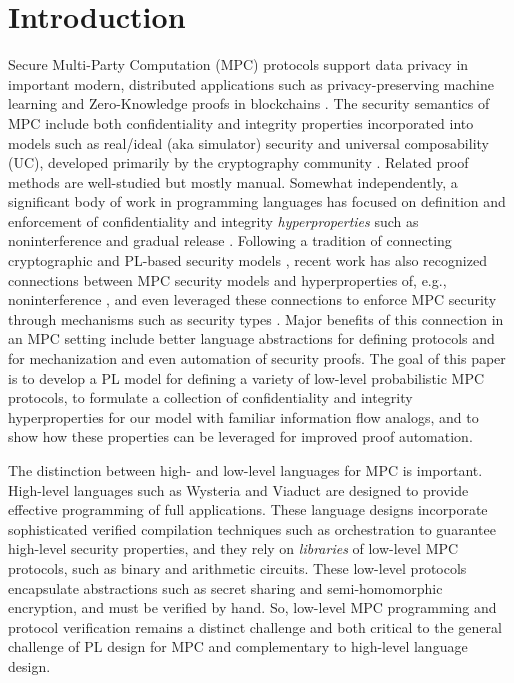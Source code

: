 \section{Introduction}

Secure Multi-Party Computation (MPC) protocols support data privacy in
important modern, distributed applications such as privacy-preserving
machine learning \cite{li2021privacy, knott2021crypten,
  koch2020privacy, liu2020privacy} and Zero-Knowledge proofs in
blockchains \cite{ishai2009zero, lu2019honeybadgermpc,
  gao2022symmeproof, tomaz2020preserving}. The security semantics of
MPC include both confidentiality and integrity properties incorporated
into models such as real/ideal (aka simulator) security and universal
composability (UC), developed primarily by the cryptography community
\cite{evans2018pragmatic}.  Related proof methods are well-studied
\cite{Lindell2017} but mostly manual. Somewhat independently, a
significant body of work in programming languages has focused on
definition and enforcement of confidentiality and integrity
\emph{hyperproperties} \cite{10.5555/1891823.1891830} such as
noninterference and gradual release
\cite{4223226,sabelfeld2009declassification}. Following a tradition of
connecting cryptographic and PL-based security models
\cite{10.1007/3-540-44929-9_1,10.1145/3571740}, recent work has also
recognized connections between MPC security models and hyperproperties
of, e.g., noninterference \cite{8429300}, and even leveraged these
connections to enforce MPC security through mechanisms such as
security types \cite{10.1145/3453483.3454074}. Major benefits of this
connection in an MPC setting include better language abstractions for
defining protocols and for mechanization and even automation of
security proofs.  The goal of this paper is to develop a PL model for
defining a variety of low-level probabilistic MPC protocols, to
formulate a collection of confidentiality and integrity
hyperproperties for our model with familiar information flow
analogs, and to show how these properties can be leveraged for
improved proof automation.

The distinction between high- and low-level languages for MPC is
important. High-level languages such as Wysteria
\cite{rastogi2014wysteria} and Viaduct \cite{10.1145/3453483.3454074}
are designed to provide effective programming of full
applications. These language designs incorporate sophisticated
verified compilation techniques such as orchestration
\cite{viaduct-UC} to guarantee high-level security properties, and
they rely on \emph{libraries} of low-level MPC protocols, such as
binary and arithmetic circuits. These low-level protocols encapsulate
abstractions such as secret sharing and semi-homomorphic encryption,
and must be verified by hand. So, low-level MPC
programming and protocol verification remains a distinct challenge and both
critical to the general challenge of PL design for MPC and
complementary to high-level language design.

